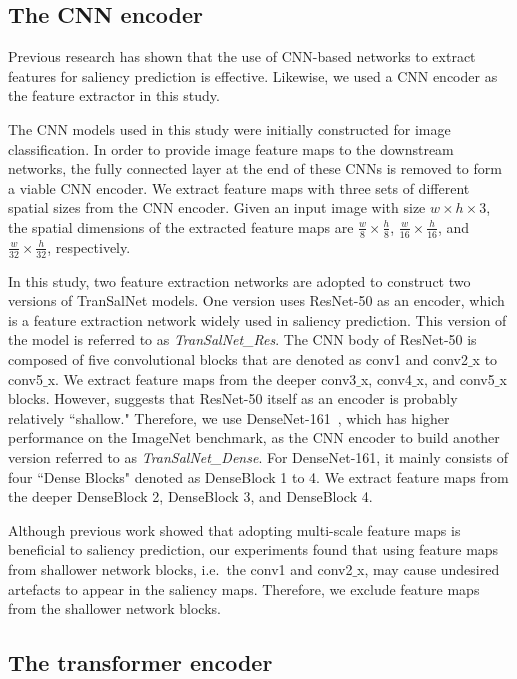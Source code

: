\documentclass{article}
\begin{document}
\subsection{The CNN encoder}
Previous research has shown that the use of CNN-based networks to extract features for saliency prediction is effective. Likewise, we used a CNN encoder as the feature extractor in this study.

The CNN models used in this study were initially constructed for image classification. In order to provide image feature maps to the downstream networks, the fully connected layer at the end of these CNNs is removed to form a viable CNN encoder. We extract feature maps with three sets of different spatial sizes from the CNN encoder. Given an input image with size $w \times h \times 3$, the spatial dimensions of the extracted feature maps are $\frac{w}{8}\times\frac{h}{8}$, $\frac{w}{16}\times\frac{h}{16}$, and $\frac{w}{32}\times\frac{h}{32}$, respectively.

In this study, two feature extraction networks are adopted to construct two versions of TranSalNet models. One version uses ResNet-50 \cite{RESNET} as an encoder, which is a feature extraction network widely used in saliency prediction. This version of the model is referred to as \textit{TranSalNet\_Res}. The CNN body of ResNet-50 is composed of five convolutional blocks that are denoted as conv1 and conv2$\_$x to conv5$\_$x. We extract feature maps from the deeper conv3$\_$x, conv4$\_$x, and conv5$\_$x blocks. However, \cite{EML-NET} suggests that ResNet-50 itself as an encoder is probably relatively ``shallow." Therefore, we use DenseNet-161~\cite{DenseNet}, which has higher performance on the ImageNet benchmark, as the CNN encoder to build another version referred to as \textit{TranSalNet\_Dense}. For DenseNet-161, it mainly consists of four ``Dense Blocks"  denoted as DenseBlock 1 to 4. We extract feature maps from the deeper DenseBlock 2, DenseBlock 3, and DenseBlock 4.


Although previous work \cite{Huang_2015, ML-Net, DVA_Wang, MSI-Net, GAZEGAN} showed that adopting multi-scale feature maps is beneficial to saliency prediction, our experiments found that using feature maps from shallower network blocks, i.e.\ the conv1 and conv2$\_$x, may cause undesired artefacts to appear in the saliency maps. Therefore, we exclude feature maps from the shallower network blocks.

\subsection{The transformer encoder}
\end{document}
